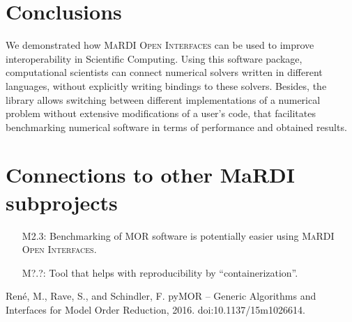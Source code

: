 \documentclass{mmposter}
\newcommand{\OIF}{\textsc{MaRDI Open Interfaces}\xspace}
\begin{document}
\section*{Conclusions}
We demonstrated how \OIF{} can be used to improve
interoperability in Scientific Computing.
Using this software package, computational scientists can connect numerical
solvers written in different languages, without explicitly writing bindings
to these solvers.
Besides, the library allows switching between different implementations
of a numerical problem without extensive modifications of a user's code,
that facilitates benchmarking numerical software in terms of performance
and obtained results.

\section*{Connections to other MaRDI subprojects}

\begin{itemize}[align=left]
  \item[\color{CEmphasis1}M2.3:] Benchmarking of MOR software is potentially
    easier using \OIF{}.
  \item[\color{CEmphasis1}M?.?:] Tool that helps with reproducibility
    by ``containerization''.
\end{itemize}

\begin{thebibliography}{1}
  \setlength{\itemsep}{1pt}
  \setlength{\parskip}{1.5pt}

  \scriptsize{

  Ren{\'{e}}, M., Rave, S., and Schindler, F.
  \newblock pyMOR -- Generic Algorithms and Interfaces for Model Order Reduction, 2016.
  \newblock doi:10.1137/15m1026614.
  }
\end{thebibliography}
\end{document}
